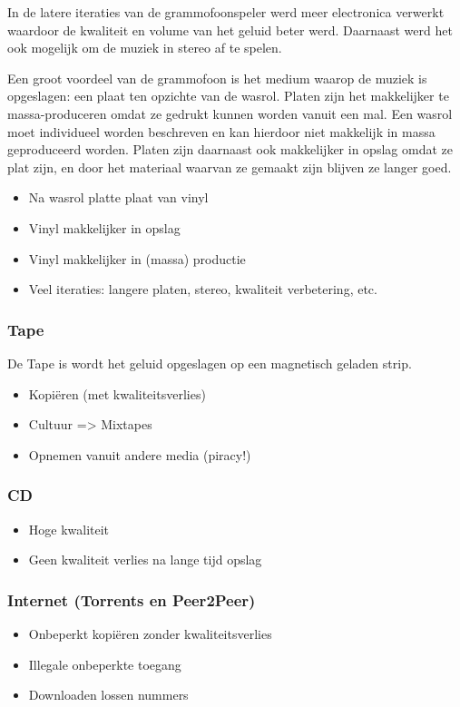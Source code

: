 In de latere iteraties van de grammofoonspeler werd meer electronica verwerkt waardoor de kwaliteit en volume van het geluid beter werd. Daarnaast werd het ook mogelijk om de muziek in stereo af te spelen.

Een groot voordeel van de grammofoon is het medium waarop de muziek is opgeslagen: een plaat ten opzichte van de wasrol. Platen zijn het makkelijker te massa-produceren omdat ze gedrukt kunnen worden vanuit een mal. Een wasrol moet individueel worden beschreven en kan hierdoor niet makkelijk in massa geproduceerd worden. Platen zijn daarnaast ook makkelijker in opslag omdat ze plat zijn, en door het materiaal waarvan ze gemaakt zijn blijven ze langer goed.

\begin{itemize}
    \item Na wasrol platte plaat van vinyl
    \item Vinyl makkelijker in opslag
    \item Vinyl makkelijker in (massa) productie
    \item Veel iteraties: langere platen, stereo, kwaliteit verbetering, etc.
\end{itemize}

\subsubsection*{Tape}
De Tape is wordt het geluid opgeslagen op een magnetisch geladen strip.

\begin{itemize}
    \item Kopiëren (met kwaliteitsverlies)
    \item Cultuur => Mixtapes
    \item Opnemen vanuit andere media (piracy!)
\end{itemize}

\subsubsection*{CD}
\begin{itemize}
    \item Hoge kwaliteit
    \item Geen kwaliteit verlies na lange tijd opslag
\end{itemize}

\subsubsection*{Internet (Torrents en Peer2Peer)}
\begin{itemize}
    \item Onbeperkt kopiëren zonder kwaliteitsverlies
    \item Illegale onbeperkte toegang
    \item Downloaden lossen nummers
\end{itemize}

